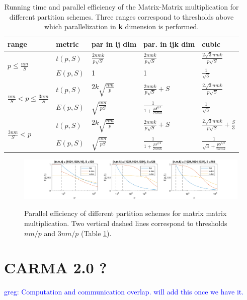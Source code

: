\documentclass[sigconf]{acmart}
\newcommand\greg[1]{\textcolor{blue}{greg: #1}}
\begin{document}
\begin{table}[t]
	\label{tab:mmmEfficiency}
	\caption{Running time and parallel efficiency of the Matrix-Matrix 
		multiplication for different partition schemes. Three ranges correspond 
		to thresholds above which parallelization in \textbf{k} dimension is 
		performed.}
	\begin{tabular}{l|l|l|l|l}
		range & metric & par in \textbf{ij} dim &par. 
		in \textbf{ijk} dim & cubic \\
		\hline
		\multirow{2}{*}{$p \le \frac{nm}{S}$} & $t(p,S)$ & 
		$\frac{2nmk}{p\sqrt{S}}$ & $\frac{2nmk}{p\sqrt{S}}$ & 
		$\frac{2\sqrt{3}nmk}{p\sqrt{S}}$ \\
		& $E(p,S)$ & 1 & 1 & 	$\frac{1}{\sqrt{3}}$\\
		\hline
		\multirow{2}{*}{$\frac{nm}{S} < p \le \frac{3nm}{S}$} & $t(p,S)$ & $2k 
		\sqrt{\frac{nm}{p}}$ & 
		$\frac{2nmk}{p\sqrt{S}} + S$ &  $\frac{2\sqrt{3}nmk}{p\sqrt{S}}$  
		\\		
		& $E(p,S)$ & $\sqrt{\frac{nm}{pS}}$ & $\frac{1}{1 + 
			\frac{pS^{3/2}}{2nmk}}$ & 	$\frac{1}{\sqrt{3}}$ \\
		\hline
		\multirow{2}{*}{$\frac{3nm}{S} < p$} & $t(p,S)$ & $2k 
		\sqrt{\frac{nm}{p}}$ & 
		$\frac{2nmk}{p\sqrt{S}} + S$ & $\frac{2\sqrt{3}nmk}{p\sqrt{S}} + 
		\frac{S}{3}$\\
		& $E(p,S)$ &	$\sqrt{\frac{nm}{pS}}$ & $\frac{1}{1 + 
			\frac{pS^{3/2}}{2nmk}}$ &	$\frac{1}{\sqrt{3} + 
			\frac{pS^{3/2}}{6nmk}}$
	\end{tabular}
\end{table}


\begin{figure}[t]
	\hspace*{-1.5cm}
	\includegraphics[width=2.5\columnwidth]{figures/mmmScaling}
	\label{fig:mmmScaling}
	\caption{Parallel efficiency of different partition schemes for matrix 
		matrix multiplication. Two vertical dashed lines correspond to 
		thresholds 
		$nm/p$ and $3nm/p$ (Table \ref{tab:mmmEfficiency}).}
\end{figure}

\section{CARMA 2.0 ?}
\label{sec:implementation}
 \greg{Computation and communication overlap. will add this once we have it.}
\end{document}
